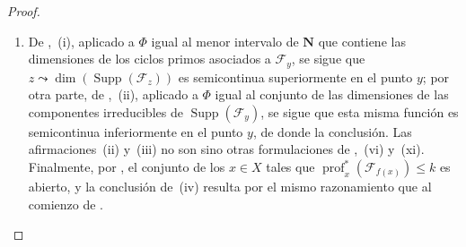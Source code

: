 \begin{proof}
\begin{enumerate}[label=(\roman*)]
  \item De ,~(i), aplicado a $\Phi$ igual al menor intervalo de $\mathbf N$ que contiene las dimensiones de los ciclos primos asociados a $\mathcal F_y$, se sigue que $z\leadsto\dim(\operatorname{Supp}(\mathcal F_z))$ es semicontinua superiormente en el punto $y$; por otra parte, de ,~(ii), aplicado a $\Phi$ igual al conjunto de las dimensiones de las componentes irreducibles de $\operatorname{Supp}(\mathcal F_y)$, se sigue que esta misma función es semicontinua inferiormente en el punto $y$, de donde la conclusión.
Las afirmaciones~(ii) y~(iii) no son sino otras formulaciones de ,~(vi) y~(xi).
Finalmente, por , el conjunto de los $x\in X$ tales que $\operatorname{prof}^{*}_x(\mathcal F_{f(x)})\leq k$ es abierto, y la conclusión de~(iv) resulta por el mismo razonamiento que al comienzo de .
\end{enumerate}
\end{proof}

